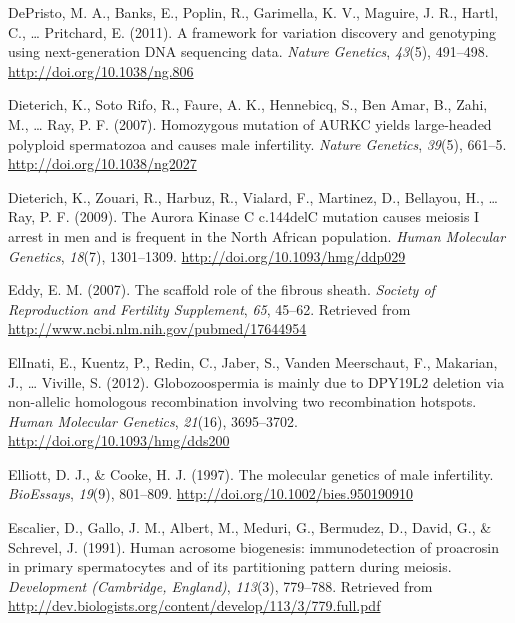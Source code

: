 \documentclass[12pt,twoside]{reedthesis}
\theoremstyle{definition}
\theoremstyle{definition}
\theoremstyle{remark}
\begin{document}
  \hypertarget{ref-DePristo2011}{}
  DePristo, M. A., Banks, E., Poplin, R., Garimella, K. V., Maguire, J.
  R., Hartl, C., \ldots{} Pritchard, E. (2011). A framework for variation
  discovery and genotyping using next-generation DNA sequencing data.
  \emph{Nature Genetics}, \emph{43}(5), 491--498.
  \url{http://doi.org/10.1038/ng.806}
  
  \hypertarget{ref-Dieterich2007}{}
  Dieterich, K., Soto Rifo, R., Faure, A. K., Hennebicq, S., Ben Amar, B.,
  Zahi, M., \ldots{} Ray, P. F. (2007). Homozygous mutation of AURKC
  yields large-headed polyploid spermatozoa and causes male infertility.
  \emph{Nature Genetics}, \emph{39}(5), 661--5.
  \url{http://doi.org/10.1038/ng2027}
  
  \hypertarget{ref-Dieterich2009}{}
  Dieterich, K., Zouari, R., Harbuz, R., Vialard, F., Martinez, D.,
  Bellayou, H., \ldots{} Ray, P. F. (2009). The Aurora Kinase C c.144delC
  mutation causes meiosis I arrest in men and is frequent in the North
  African population. \emph{Human Molecular Genetics}, \emph{18}(7),
  1301--1309. \url{http://doi.org/10.1093/hmg/ddp029}
  
  \hypertarget{ref-Eddy2007}{}
  Eddy, E. M. (2007). The scaffold role of the fibrous sheath.
  \emph{Society of Reproduction and Fertility Supplement}, \emph{65},
  45--62. Retrieved from \url{http://www.ncbi.nlm.nih.gov/pubmed/17644954}
  
  \hypertarget{ref-ElInati2012}{}
  ElInati, E., Kuentz, P., Redin, C., Jaber, S., Vanden Meerschaut, F.,
  Makarian, J., \ldots{} Viville, S. (2012). Globozoospermia is mainly due
  to DPY19L2 deletion via non-allelic homologous recombination involving
  two recombination hotspots. \emph{Human Molecular Genetics},
  \emph{21}(16), 3695--3702. \url{http://doi.org/10.1093/hmg/dds200}
  
  \hypertarget{ref-Elliott1997}{}
  Elliott, D. J., \& Cooke, H. J. (1997). The molecular genetics of male
  infertility. \emph{BioEssays}, \emph{19}(9), 801--809.
  \url{http://doi.org/10.1002/bies.950190910}
  
  \hypertarget{ref-Escalier1991}{}
  Escalier, D., Gallo, J. M., Albert, M., Meduri, G., Bermudez, D., David,
  G., \& Schrevel, J. (1991). Human acrosome biogenesis: immunodetection
  of proacrosin in primary spermatocytes and of its partitioning pattern
  during meiosis. \emph{Development (Cambridge, England)}, \emph{113}(3),
  779--788. Retrieved from
  \url{http://dev.biologists.org/content/develop/113/3/779.full.pdf}
  
\end{document}
